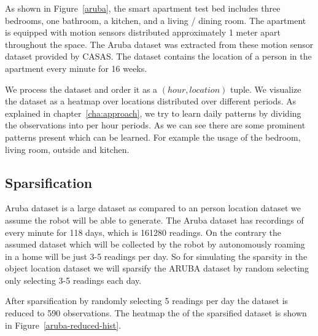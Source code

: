 As shown in Figure~\ref{aruba}, the smart apartment test bed includes three bedrooms, one bathroom, a kitchen, and a living / dining room.  The apartment is equipped with motion sensors distributed approximately 1 meter apart throughout the space. The Aruba dataset was extracted from these motion sensor dataset provided by CASAS. The dataset contains the location of a person in the apartment every minute for 16 weeks.

We process the dataset and  order it as a  $(hour,location)$ tuple. We visualize the dataset as a heatmap over locations distributed over different periods. As explained in chapter~\ref{cha:approach}, we try to learn daily patterns by dividing the observations into per hour periods. As we can see there are some prominent patterns present which can be learned. For example the usage of the bedroom, living room, outside and kitchen.


\subsection*{Sparsification}
Aruba dataset is a large dataset as compared to an person location dataset we assume the robot will be able to generate. The Aruba dataset has recordings of every minute for 118 days, which is 161280 readings.
On the contrary the assumed dataset which will be collected by the robot by autonomously roaming in a home will be just 3-5 readings per day.
So for simulating the sparsity in the object location dataset we will sparsify the ARUBA dataset by random selecting only selecting 3-5 readings each day.

After sparsification by randomly selecting 5 readings per day the dataset is reduced to 590 observations. The heatmap the of the sparsified dataset is shown in Figure~\ref{aruba-reduced-hist}. 



